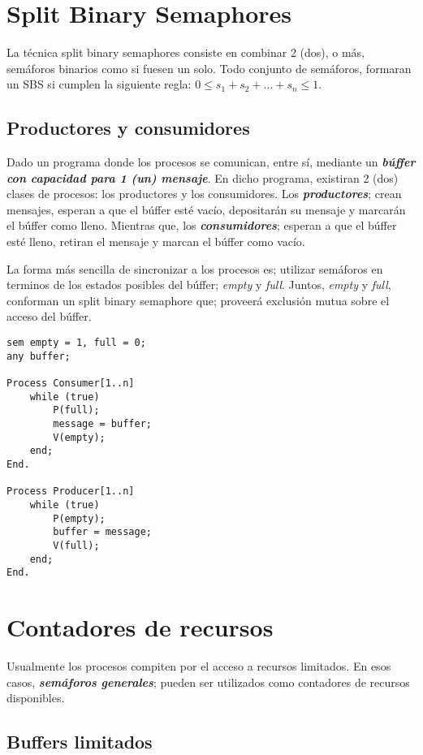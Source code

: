 \documentclass[a4paper, 10pt]{report}
\begin{document}
\section{Split Binary Semaphores}

La técnica split binary semaphores consiste en combinar 2 (dos), o más, semáforos binarios como si fuesen un solo. Todo conjunto de semáforos, formaran un SBS si cumplen la siguiente regla: $0 \leq s_{1} + s_{2} + ... + s_{n} \leq 1$.

\subsection{Productores y consumidores}

Dado un programa donde los procesos se comunican, entre sí, mediante un \textbf{\emph{búffer con capacidad para 1 (un) mensaje}}. En dicho programa, existiran 2 (dos) clases de procesos: los productores y los consumidores. Los \textbf{\emph{productores}}; crean mensajes, esperan a que el búffer esté vacío, depositarán su mensaje y marcarán el búffer como lleno. Mientras que, los \textbf{\emph{consumidores}}; esperan a que el búffer esté lleno, retiran el mensaje y marcan el búffer como vacío.

La forma más sencilla de sincronizar a los procesos es; utilizar semáforos en terminos de los estados posibles del búffer; \emph{empty} y \emph{full}. Juntos, \emph{empty} y \emph{full}, conforman un split binary semaphore que; proveerá exclusión mutua sobre el acceso del búffer.

\begin{lstlisting}[multicols=2]
sem empty = 1, full = 0;
any buffer;

Process Consumer[1..n]
    while (true)
        P(full);
        message = buffer;
        V(empty);
    end;
End.

Process Producer[1..n]
    while (true)
        P(empty);
        buffer = message;
        V(full);
    end;
End.
\end{lstlisting}

\section{Contadores de recursos}

Usualmente los procesos compiten por el acceso a recursos limitados. En esos casos, \textbf{\emph{semáforos generales}}; pueden ser utilizados como contadores de recursos disponibles.

\subsection{Buffers limitados}
\end{document}
